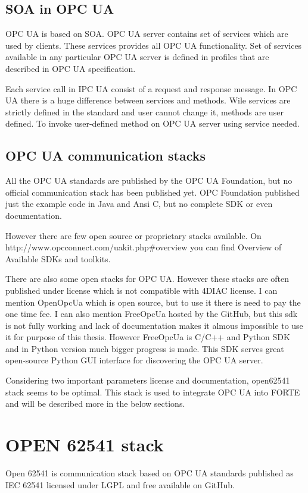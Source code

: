 \subsection{SOA in OPC UA}
OPC UA is based on SOA. OPC UA server contains set of services which are used by clients. These services provides all OPC UA functionality. 
Set of services available in any particular OPC UA server is defined in profiles that are described in OPC UA specification.

Each service call in IPC UA consist of a request and response message. 
In OPC UA there is a huge difference between services and methods. Wile services are strictly defined in the standard and user cannot change it, methods are user defined.
To invoke user-defined method on OPC UA server using service needed. 

\subsection{OPC UA communication stacks}
All the OPC UA standards are published by the OPC UA Foundation, but no official communication stack has been published yet.
OPC Foundation published just the example code in Java and Ansi C, but no complete SDK or even documentation.

However there are few open source or proprietary stacks available. 
On http://www.opcconnect.com/uakit.php#overview you can find Overview of Available SDKs and toolkits. 

There are also some open stacks for OPC UA. However these stacks are often published under license which is not compatible with 4DIAC license. 
I can mention OpenOpcUa which is open source, but to use it there is need to pay the one time fee. I can also mention FreeOpcUa hosted by the GitHub, but this sdk is not fully working and lack of documentation makes it almous impossible to use it for purpose of this thesis. However FreeOpcUa is C/C++ and Python SDK and in Python version much bigger progress is made. This SDK serves great open-source Python GUI interface for discovering the OPC UA server. 

Considering two important parameters license and documentation, open62541 stack seems to be optimal. This stack is used to integrate OPC UA into FORTE and will be described more in the below sections.


\section{OPEN 62541 stack}
Open 62541 is communication stack based on OPC UA standards published as IEC 62541 licensed under LGPL and free available on GitHub.

